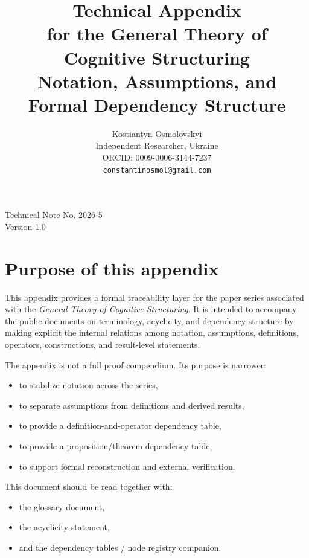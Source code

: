 \documentclass[11pt,a4paper]{article}
\title{Technical Appendix\\ for the General Theory of Cognitive Structuring\\
	\large Notation, Assumptions, and Formal Dependency Structure}
\author{
	Kostiantyn Osmolovskyi\\
	\small Independent Researcher, Ukraine\\
	\small ORCID: 0009-0006-3144-7237\\
	\small \texttt{constantinosmol@gmail.com}
}
\date{}
\begin{document}
	\maketitle

\begin{center}
	\small
	Technical Note No. 2026-5\\
	Version 1.0
\end{center}

\vspace{0.5em}
	
	\maketitle
	
	\section{Purpose of this appendix}
	
	This appendix provides a formal traceability layer for the paper series associated with the
	\emph{General Theory of Cognitive Structuring}. It is intended to accompany the public
	documents on terminology, acyclicity, and dependency structure by making explicit the
	internal relations among notation, assumptions, definitions, operators, constructions, and
	result-level statements.
	
	The appendix is not a full proof compendium. Its purpose is narrower:
	\begin{itemize}[leftmargin=2em]
		\item to stabilize notation across the series,
		\item to separate assumptions from definitions and derived results,
		\item to provide a definition-and-operator dependency table,
		\item to provide a proposition/theorem dependency table,
		\item to support formal reconstruction and external verification.
	\end{itemize}
	
	This document should be read together with:
	\begin{itemize}[leftmargin=2em]
		\item the glossary document,
		\item the acyclicity statement,
		\item and the dependency tables / node registry companion.
	\end{itemize}
	
\end{document}
